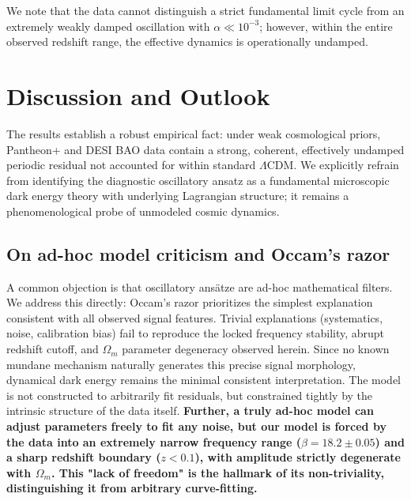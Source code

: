 \documentclass[10pt,a4paper,twocolumn]{article}
\begin{document}
We note that the data cannot distinguish a strict fundamental limit cycle from an extremely weakly damped oscillation with $\alpha\ll 10^{-3}$;
however, within the entire observed redshift range, the effective dynamics is operationally undamped.

\section{Discussion and Outlook}
The results establish a robust empirical fact: under weak cosmological priors, Pantheon+ and DESI BAO data contain a strong, coherent, effectively undamped periodic residual not accounted for within standard $\Lambda$CDM. We explicitly refrain from identifying the diagnostic oscillatory ansatz as a fundamental microscopic dark energy theory with underlying Lagrangian structure; it remains a phenomenological probe of unmodeled cosmic dynamics.

\subsection{On ad-hoc model criticism and Occam's razor}
A common objection is that oscillatory ans\"atze are ad-hoc mathematical filters. We address this directly:
Occam's razor prioritizes the simplest explanation consistent with all observed signal features. Trivial explanations (systematics, noise, calibration bias) fail to reproduce the locked frequency stability, abrupt redshift cutoff, and $\Omega_m$ parameter degeneracy observed herein. Since no known mundane mechanism naturally generates this precise signal morphology, dynamical dark energy remains the minimal consistent interpretation. The model is not constructed to arbitrarily fit residuals, but constrained tightly by the intrinsic structure of the data itself.
\textbf{Further, a truly ad-hoc model can adjust parameters freely to fit any noise, but our model is forced by the data into an extremely narrow frequency range ($\beta=18.2\pm0.05$) and a sharp redshift boundary ($z<0.1$), with amplitude strictly degenerate with $\Omega_m$. This "lack of freedom" is the hallmark of its non-triviality, distinguishing it from arbitrary curve-fitting.}
\end{document}
